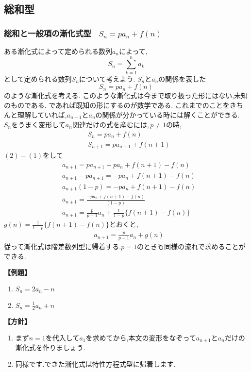 \documentclass[dvipdfmx,a4paper,11pt,fleqn,openany]{jsbook}
\begin{document}
  \subsection{総和型}
    \subsubsection{総和と一般項の漸化式型 \, $S_n=pa_n+f(n)$}
      ある漸化式によって定められる数列$a_n$によって,
      \[
        S_n=\sum_{k=1}^{n} a_k
      \]
      として定められる数列$S_n$について考えよう.
      $S_n$と$a_n$の関係を表した
      \[
        S_n=pa_n+f(n)
      \]
      のような漸化式を考える.
      このような漸化式は今まで取り扱った形にはない,未知のものである.
      であれば既知の形にするのが数学である.
      これまでのことをきちんと理解していれば,$a_{n+1}$と$a_n$の関係が分かっている時には解くことができる.
      $S_n$をうまく変形して$a_{n}$関連だけの式を産むには,\,$p \neq 1$の時,
      \begin{align*}
        &S_n=pa_n+f(n) \tag{1}\\
        &S_{n+1}=pa_{n+1}+f(n+1) \tag{2}
      \end{align*}
      $(2)-(1)$をして
      \begin{align*}
        &a_{n+1}=pa_{n+1}-pa_n+f(n+1)-f(n)\\
        &a_{n+1}-pa_{n+1}=-pa_n+f(n+1)-f(n)\\
        &a_{n+1}(1-p)=-pa_n+f(n+1)-f(n)\\
        &a_{n+1}=\frac{-pa_n+f(n+1)-f(n)}{(1-p)}\\
        &a_{n+1}=\frac{p}{p-1}a_n+\frac{1}{1-p}\{f(n+1)-f(n)\}
      \end{align*}
      $\displaystyle g(n)=\frac{1}{1-p}\{f(n+1)-f(n)\}$とおくと,
      \begin{align*}
        &a_{n+1}=\frac{p}{p-1}a_n+g(n)
      \end{align*}
      従って漸化式は階差数列型に帰着する.$p=1$のときも同様の流れで求めることができる.

      \noindent \textbf{【例題】}
      \begin{enumerate}[label=(\arabic*),parsep=3pt]
        \item $\displaystyle S_n=2a_n-n$
        \item $\displaystyle S_n=\frac12a_n+n$
      \end{enumerate}

      \noindent\textbf{【方針】}
      \begin{enumerate}[label=(\arabic*),parsep=3pt]
        \item まず$n=1$を代入して$a_1$を求めてから,本文の変形をなぞって$a_{n+1}$と$a_n$だけの漸化式を作りましょう.
        \item 同様です.できた漸化式は特性方程式型に帰着します.
      \end{enumerate}
\end{document}
